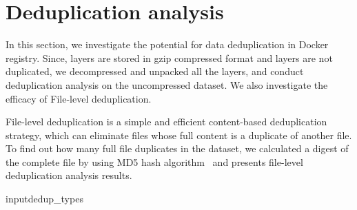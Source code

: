 \section{Deduplication analysis}
\label{sec:redundant_files}

In this section, we investigate the potential for data deduplication in Docker
registry.
%
Since, layers are stored in gzip compressed format and layers are not
duplicated, we decompressed and unpacked all the layers, and conduct
deduplication analysis on the uncompressed dataset.
%
We also investigate the efficacy of File-level deduplication.

File-level deduplication is a simple and efficient content-based deduplication
strategy, which can eliminate files whose full content is a duplicate of
another file.
%
To find out how many full file duplicates in the dataset, we calculated a
digest of the complete file by using MD5 hash algorithm~\cite{MD5} and presents
file-level deduplication analysis results.


input{dedup_types}
